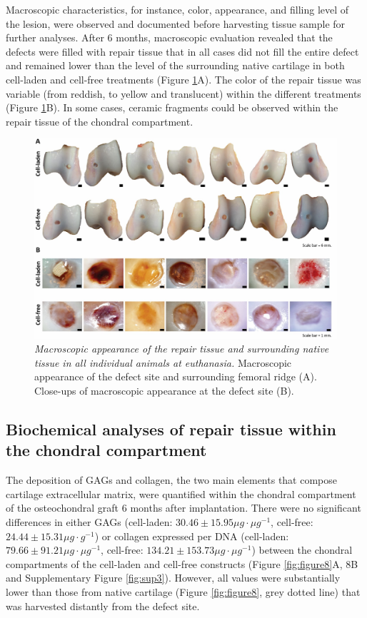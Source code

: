 \documentclass[twocolumn, serif, empirical, authordate, seplic]{jote-article}
\begin{document}
Macroscopic characteristics, for instance, color, appearance, and filling level of the lesion, were observed and documented before harvesting tissue sample for further analyses. After 6 months, macroscopic evaluation revealed that the defects were filled with repair tissue that in all cases did not fill the entire defect and remained lower than the level of the surrounding native cartilage in both cell-laden and cell-free treatments (Figure \ref{fig:figure7}A). The color of the repair tissue was variable (from reddish, to yellow and translucent) within the different treatments (Figure \ref{fig:figure7}B). In some cases, ceramic fragments could be observed within the repair tissue of the chondral compartment.

\begin{figure}
\centering \includegraphics[width=\columnwidth]{articles/empirical/horse/media/image7.jpg}
\caption{\emph{Macroscopic appearance of the repair tissue and surrounding native tissue in all individual animals at euthanasia.} Macroscopic appearance of the defect site and surrounding femoral ridge (A). Close-ups of macroscopic appearance at the defect site (B).}
\label{fig:figure7}\end{figure}


 {}\subsection*{Biochemical analyses of repair tissue within the chondral compartment} 

The deposition of GAGs and collagen, the two main elements that compose cartilage extracellular matrix, were quantified within the chondral compartment of the osteochondral graft 6 months after implantation. There were no significant differences in either GAGs (cell-laden: $30.46 \pm 15.95 \mu g\cdot\mu g^{-1}$, cell-free: $24.44 \pm 15.31 \mu g\cdot g^{-1}$) or collagen expressed per DNA (cell-laden: $79.66 \pm 91.21 \mu g\cdot\mu g^{-1}$, cell-free: $134.21\pm 153.73 \mu g\cdot\mu g^{-1}$) between the chondral compartments of the cell-laden and cell-free constructs (Figure \ref{fig:figure8}A, 8B and Supplementary Figure \ref{fig:sup3}). However, all values were substantially lower than those from native cartilage (Figure \ref{fig:figure8}, grey dotted line) that was harvested distantly from the defect site.
\end{document}
